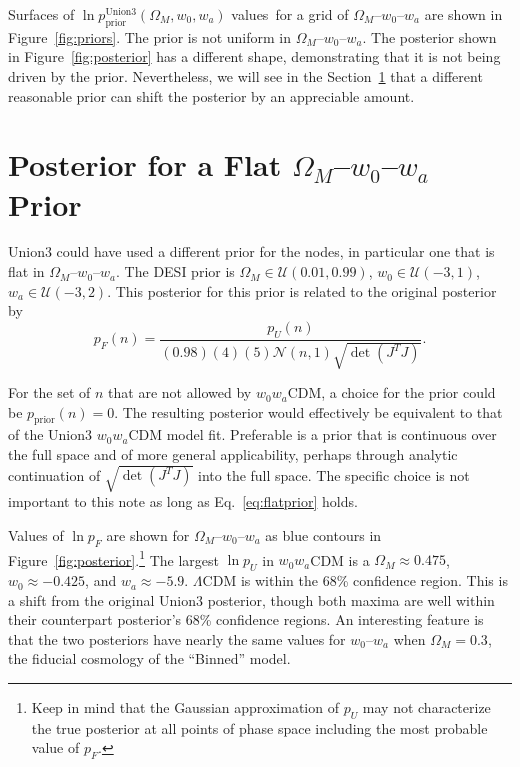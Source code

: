 \documentclass[11pt,a4paper]{article}
\begin{document}
Surfaces of  $\ln{p^\text{Union3}_\text{prior}}(\Omega_M, w_0,w_a)$ values\ for a grid of $\Omega_M$--$w_0$--$w_a$ are shown in
Figure~\ref{fig:priors}.   The prior is not uniform in  $\Omega_M$--$w_0$--$w_a$.
The posterior shown in Figure~\ref{fig:posterior} has a different shape,
demonstrating that it is not being driven by the prior.  Nevertheless,
we will see in the  Section~\ref{sec:flatposterior} that a different reasonable prior can shift the posterior
by an appreciable amount.

\section{Posterior for a Flat  $\Omega_M$--$w_0$--$w_a$  Prior}
\label{sec:flatposterior}
Union3 could have used a different prior for the nodes, in particular one
that is flat in $\Omega_M$--$w_0$--$w_a$.
The DESI prior is $\Omega_M \in \mathcal{U}(0.01,0.99)$, $w_0 \in \mathcal{U}(-3,1)$, $w_a \in \mathcal{U}(-3,2)$.
This posterior for this prior is related to the original posterior by
\begin{equation}
p_F(n) = \frac{p_U(n)}{(0.98)(4)(5) \mathcal{N}(n,1)  \sqrt{\det{\left(J^T J\right)}}}.
\label{eq:flatprior}
\end{equation}

For the set of $n$ that are not allowed by $w_0w_a$CDM,  a choice for the prior could be $p_\text{prior}(n)=0$.  The resulting posterior
would effectively be equivalent to that of the Union3 $w_0w_a$CDM model fit.
Preferable is a prior that is continuous over the full space and of more general applicability,
perhaps through analytic continuation of $\sqrt{\det{\left(J^T J\right)}}$ into the full space.
The specific choice is not important to this note as long as Eq.~\ref{eq:flatprior} holds.

Values of $\ln{p}_F$ are shown for  $\Omega_M$--$w_0$--$w_a$ as blue contours in Figure~\ref{fig:posterior}.\footnote{Keep in mind that the Gaussian approximation of $p_U$ may not characterize the true posterior at all points of
phase space including the most probable value of $p_F$.}
The largest $\ln{p_U}$ in $w_0w_a$CDM is a $\Omega_M\approx 0.475$, $w_0 \approx -0.425$, and $w_a \approx -5.9$. $\Lambda$CDM 
is within the 68\% confidence region.  This is a shift from the original Union3 posterior, though both maxima are well within their counterpart
posterior's 68\% confidence regions.  An interesting feature is that the two posteriors have nearly the same values for $w_0$--$w_a$ when $\Omega_M=0.3$, the fiducial cosmology of the ``Binned'' model.
\end{document}
